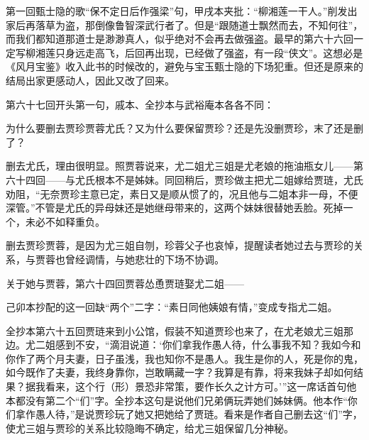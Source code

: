\par 第一回甄士隐的歌“保不定日后作强梁”句，甲戌本夹批：“柳湘莲一干人。”削发出家后再落草为盗，那倒像鲁智深武行者了。但是“跟随道士飘然而去，不知何往”，而我们都知道那道士是渺渺真人，似乎绝对不会再去做强盗。最早的第六十六回一定写柳湘莲只身远走高飞，后回再出现，已经做了强盗，有一段“侠文”。这想必是《风月宝鉴》收入此书的时候改的，避免与宝玉甄士隐的下场犯重。但还是原来的结局出家更感动人，因此又改了回来。
\par 第六十七回开头第一句，戚本、全抄本与武裕庵本各各不同：
\par 为什么要删去贾珍贾蓉尤氏？又为什么要保留贾珍？还是先没删贾珍，末了还是删了？
\par 删去尤氏，理由很明显。照贾蓉说来，尤二姐尤三姐是尤老娘的拖油瓶女儿——第六十四回——与尤氏根本不是姊妹。同回稍后，贾珍做主把尤二姐嫁给贾琏，尤氏劝阻，“无奈贾珍主意已定，素日又是顺从惯了的，况且他与二姐本非一母，不便深管。”不管是尤氏的异母妹还是她继母带来的，这两个妹妹很替她丢脸。死掉一个，未必不如释重负。
\par 删去贾珍贾蓉，是因为尤三姐自刎，珍蓉父子也哀悼，提醒读者她过去与贾珍的关系，与贾蓉也曾经调情，与她悲壮的下场不协调。
\par 关于她与贾蓉，第六十四回贾蓉怂恿贾琏娶尤二姐——
\par 己卯本抄配的这一回缺“两个”二字：“素日同他姨娘有情，”变成专指尤二姐。
\par 全抄本第六十五回贾琏来到小公馆，假装不知道贾珍也来了，在尤老娘尤三姐那边。尤二姐感到不安，“滴泪说道：‘你们拿我作愚人待，什么事我不知？我如今和你作了两个月夫妻，日子虽浅，我也知你不是愚人。我生是你的人，死是你的鬼，如今既作了夫妻，我终身靠你，岂敢瞒藏一字？我算是有靠，将来我妹子却如何结果？据我看来，这个行（形）景恐非常策，要作长久之计方可。'”这一席话首句他本都没有第二个“们”字。全抄本这句是说他们兄弟俩玩弄她们姊妹俩。他本作“你们拿作愚人待，”是说贾珍玩了她又把她给了贾琏。看来是作者自己删去这“们”字，使尤三姐与贾珍的关系比较隐晦不确定，给尤三姐保留几分神秘。
